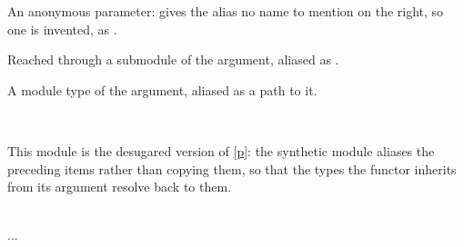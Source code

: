\begin{ocamlindent}
\medbreak
\label{Oxcaml-Include_functor_argument_shapes--type-anonymous}\begin{ocamlindent}An anonymous parameter: \ocamlinlinecode{\_\allowbreak{}} gives the alias no name to mention on the right, so one is invented, as .\end{ocamlindent}%
\medbreak
\label{Oxcaml-Include_functor_argument_shapes--type-from_module}\begin{ocamlindent}Reached through a submodule of the argument, aliased as .\end{ocamlindent}%
\medbreak
\label{Oxcaml-Include_functor_argument_shapes--module-type-Reexported}\begin{ocamlindent}A module type of the argument, aliased as a path to it.\end{ocamlindent}%
\medbreak
\end{ocamlindent}%
\\
\label{Oxcaml--module-Include_functor_desugared}\label{Oxcaml-Include_functor_desugared}\begin{ocamlindent}\label{Oxcaml-Include_functor_desugared--module-Make}\begin{ocamlindent}This module is the desugared version of \hyperref[Oxcaml-Include_functor]{[p\pageref*{Oxcaml-Include_functor}]}: the synthetic module aliases the preceding items rather than copying them, so that the types the functor inherits from its argument resolve back to them.\end{ocamlindent}%
\medbreak
\label{Oxcaml-Include_functor_desugared--type-t}\\
  .\allowbreak{}.\allowbreak{}.\allowbreak{} \label{Oxcaml-Include_functor_desugared--type-included}\\
\end{ocamlindent}%
